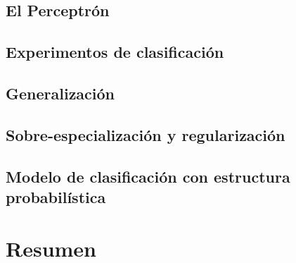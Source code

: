 \subsection{El Perceptrón}
\label{aprendizaje:perceptron}

\subsection{Experimentos de clasificación}

\subsection{Generalización}


\subsection{Sobre-especialización y regularización}

\subsection{Modelo de clasificación con estructura probabilística}

\section{Resumen}
